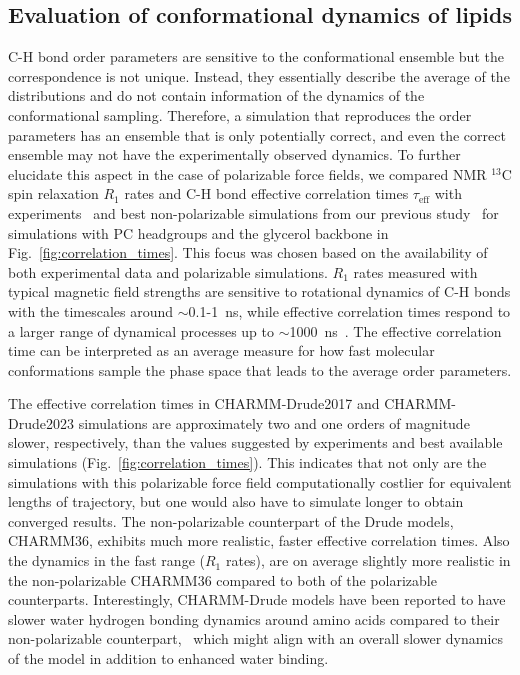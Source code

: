 \documentclass[journal=jacsat,manuscript=article,layout=singlecolumn]{achemso}
\begin{document}
\subsection{Evaluation of conformational dynamics of lipids}
C-H bond order parameters are sensitive to the conformational ensemble but the correspondence is not unique. Instead, they essentially describe the average of the distributions and do not contain information of the dynamics of the conformational sampling. Therefore, a simulation that reproduces the order parameters has an ensemble that is only potentially correct, and even the correct ensemble may not have the experimentally observed dynamics. To further elucidate this aspect in the case of polarizable force fields, we compared NMR $^{13}$C spin relaxation $R_{1}$ rates and C-H bond effective correlation times $\tau_{\mathrm{eff}}$ with experiments~\cite{ferreira15} and best non-polarizable simulations from our previous study~\cite{Antila2021} for simulations with PC headgroups and the glycerol backbone in Fig.~\ref{fig:correlation_times}. This focus was chosen based on the availability of both experimental data and polarizable simulations. $R_{1}$ rates measured with typical magnetic field strengths are sensitive to rotational dynamics of C-H bonds with the timescales around $\sim$0.1-1~ns, while effective correlation times respond to a larger range of dynamical processes up to $\sim$1000~ns~\cite{ferreira15}. The effective correlation time can be interpreted as an average measure for how fast molecular conformations sample the phase space that leads to the average order parameters.

The effective correlation times in CHARMM-Drude2017 and CHARMM-Drude2023 simulations are approximately two  and one orders of magnitude slower, respectively, than the values suggested by experiments and best available simulations (Fig.~\ref{fig:correlation_times}). This indicates that not only are the simulations with this polarizable force field computationally costlier for equivalent lengths of trajectory, but one would also have to simulate longer to obtain converged results. The non-polarizable counterpart of the Drude models, CHARMM36, exhibits much more realistic, faster effective correlation times. Also the dynamics in the fast range ($R_{1}$ rates), are on average slightly more realistic in the non-polarizable CHARMM36 compared to both of the polarizable counterparts. Interestingly, CHARMM-Drude models have been reported to have slower water hydrogen bonding dynamics around amino acids compared to their non-polarizable counterpart,~\cite{Ngo2019} which might align with an overall slower dynamics of the model in addition to enhanced water binding. 
\end{document}
